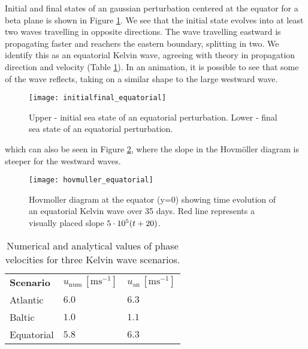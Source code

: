 Initial and final states of an gaussian perturbation centered at the equator for a beta plane is shown in Figure \ref{fig:initialfinal_equatorial}. We see that the initial state evolves into at least two waves travelling in opposite directions. The wave travelling eastward is propagating faster and reachers the eastern boundary, splitting in two. We identify this as an equatorial Kelvin wave, agreeing with theory in propagation direction and velocity (Table \ref{tab:velocities}). In an animation, it is possible to see that some of the wave reflects, taking on a similar shape to the large westward wave.
	\begin{figure}[htbp]
		\centering
		\texttt{[image: initialfinal\_equatorial]}
		\caption{Upper - initial sea state of an equatorial perturbation. Lower - final sea state of an equatorial perturbation.}
		\label{fig:initialfinal_equatorial}
	\end{figure}
which can also be seen in Figure \ref{fig:equatorial}, where the slope in the Hovmöller diagram is steeper for the westward waves.
	\begin{figure}[htbp]
		\centering
		\texttt{[image: hovmuller\_equatorial]}
		\caption{Hovmoller diagram at the equator (y=0) showing time evolution of an equatorial Kelvin wave over 35 days. Red line represents a visually placed slope $5 \cdot 10^5\qty(t + 20)$.}
		\label{fig:equatorial}
	\end{figure}

	\begin{table}[htbp]
		\begin{tabular}{lll}
			\textbf{Scenario} &\textbf{$u_{\text{num}} \, [\text{m}\text{s}^{-1}]$} & \textbf{$ u_{\text{an}} \, [\text{m}\text{s}^{-1}]$} \\
			Atlantic & $ 6.0 $ & $ 6.3 $ \\
			Baltic & $ 1.0 $ & $ 1.1 $ \\
			Equatorial & $ 5.8 $ & $ 6.3 $
		\end{tabular}
		\caption{Numerical and analytical values of phase velocities for three Kelvin wave scenarios.}
		\label{tab:velocities}
	\end{table}